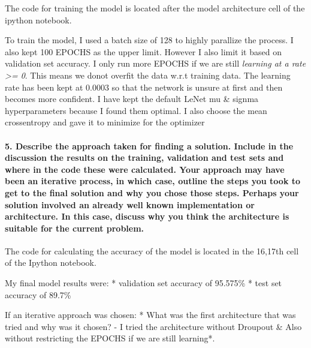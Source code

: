 \documentclass[11pt]{article}
\begin{document}
The code for training the model is located after the model architecture
cell of the ipython notebook.

To train the model, I used a batch size of 128 to highly parallize the
process. I also kept 100 EPOCHS as the upper limit. However I also limit
it based on validation set accuracy. I only run more EPOCHS if we are
still \emph{learning at a rate \textgreater{}= 0}. This means we donot
overfit the data w.r.t training data. The learning rate has been kept at
0.0003 so that the network is unsure at first and then becomes more
confident. I have kept the default LeNet mu \& signma hyperparameters
because I found them optimal. I also choose the mean crossentropy and
gave it to minimize for the optimizer

\paragraph{5. Describe the approach taken for finding a solution.
Include in the discussion the results on the training, validation and
test sets and where in the code these were calculated. Your approach may
have been an iterative process, in which case, outline the steps you
took to get to the final solution and why you chose those steps. Perhaps
your solution involved an already well known implementation or
architecture. In this case, discuss why you think the architecture is
suitable for the current
problem.}\label{describe-the-approach-taken-for-finding-a-solution.-include-in-the-discussion-the-results-on-the-training-validation-and-test-sets-and-where-in-the-code-these-were-calculated.-your-approach-may-have-been-an-iterative-process-in-which-case-outline-the-steps-you-took-to-get-to-the-final-solution-and-why-you-chose-those-steps.-perhaps-your-solution-involved-an-already-well-known-implementation-or-architecture.-in-this-case-discuss-why-you-think-the-architecture-is-suitable-for-the-current-problem.}

The code for calculating the accuracy of the model is located in the
16,17th cell of the Ipython notebook.

My final model results were: * validation set accuracy of 95.575\% *
test set accuracy of 89.7\%

If an iterative approach was chosen: * What was the first architecture
that was tried and why was it chosen? - I tried the architecture without
Droupout \& Also without restricting the EPOCHS if we are still
learning*.
\end{document}
